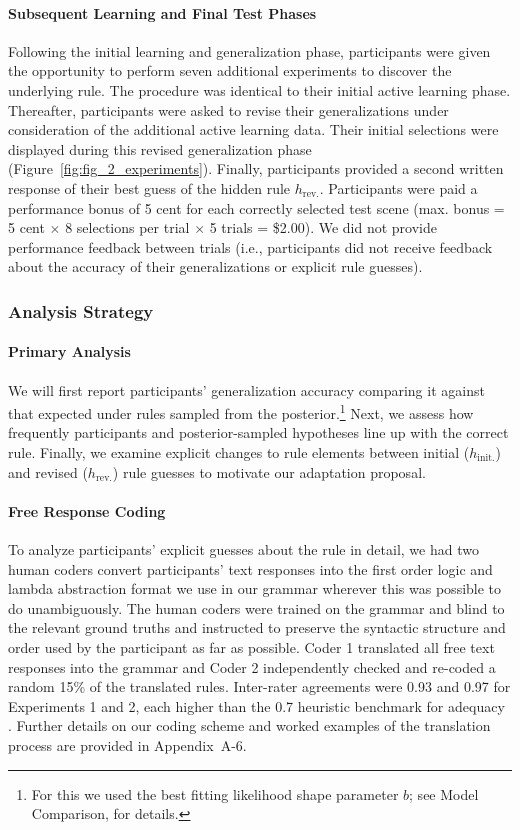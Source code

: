 \documentclass[doc,natbib,floatsintext]{apa7}
\newcommand{\hr}{h_{\mathrm{rev.}}}
\newcommand{\hi}{h_{\mathrm{init.}}}
\begin{document}
\paragraph{Subsequent Learning and Final Test Phases}
Following the initial learning and generalization phase, participants were given the opportunity to perform seven additional experiments to discover the underlying rule. The procedure was identical to their initial active learning phase. Thereafter, participants were asked to revise their generalizations under consideration of the additional active learning data. Their initial selections were displayed during this revised generalization phase (Figure~\ref{fig:fig_2_experiments}). Finally, participants provided a second written response of their best guess of the hidden rule $\hr$. Participants were paid a performance bonus of 5 cent for each correctly selected test scene (max. bonus = 5 cent $\times$ 8 selections per trial $\times$ 5 trials = \$2.00). We did not provide performance feedback between trials (i.e., participants did not receive feedback about the accuracy of their generalizations or explicit rule guesses).


\subsubsection{Analysis Strategy}
\paragraph{Primary Analysis}
We will first report participants' generalization accuracy comparing it against that expected under rules sampled from the posterior.\footnote{For this we used the best fitting likelihood shape parameter $b$; see Model Comparison, for details.} Next, we assess how frequently participants and posterior-sampled hypotheses line up with the correct rule. Finally, we examine explicit changes to rule elements between initial ($\hi$) and revised ($\hr$) rule guesses to motivate our adaptation proposal.

\paragraph{Free Response Coding}
To analyze participants' explicit guesses about the rule in detail, we had two human coders convert participants' text responses into the first order logic and lambda abstraction format we use in our grammar wherever this was possible to do unambiguously. The human coders were trained on the grammar and blind to the relevant ground truths and instructed to preserve the syntactic structure and order used by the participant as far as possible. Coder 1 translated all free text responses into the grammar and Coder 2 independently checked and re-coded a random 15\% of the translated rules. Inter-rater agreements were 0.93 and 0.97 for Experiments 1 and 2, each higher than the 0.7 heuristic benchmark for adequacy \citep{krippendorff2018content}. Further details on our coding scheme and worked examples of the translation process are provided in Appendix~A-6.
\end{document}
